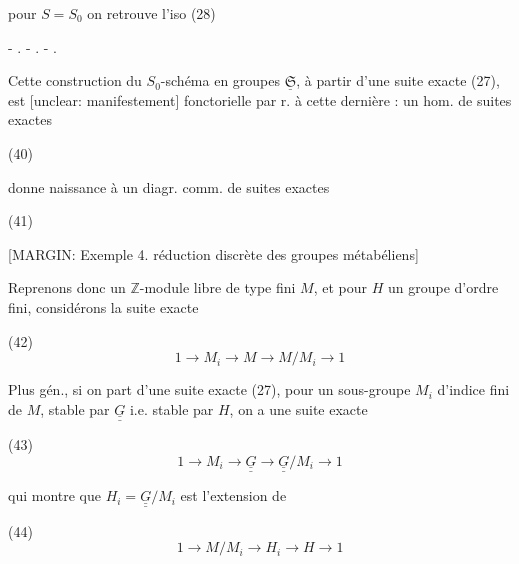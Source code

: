 pour $S=S_0$ on retrouve l'iso (28)

- . - . - .

Cette construction du $S_0$-schéma en
groupes $\underline{\mathfrak{S}}$, à partir d'une
suite exacte (27), est [unclear: manifestement]
fonctorielle par r. à cette dernière : un
hom. de suites exactes

(40)

donne naissance à un diagr. comm.
de suites exactes

\newpage


(41)

[MARGIN: Exemple 4. réduction discrète des groupes métabéliens]

Reprenons donc un $\mathbb{Z}$-module libre
de type fini $M$, et pour $H$ un
groupe d'ordre fini, considérons
la suite exacte

(42) $$1 \longrightarrow M_i \longrightarrow M \longrightarrow M/M_i \longrightarrow 1$$

Plus gén., si on part d'une suite
exacte (27), pour un sous-groupe $M_i$
d'indice fini de $M$, stable par
$\underline{\underline{G}}$ i.e. stable par $H$, on a une
suite exacte

(43) $$1 \longrightarrow M_i \longrightarrow \underline{\underline{G}} \longrightarrow \underline{\underline{G}}/M_i \longrightarrow 1$$

qui montre que $H_i = \underline{\underline{G}}/M_i$
est l'extension de

(44) $$1 \longrightarrow M/M_i \longrightarrow H_i \longrightarrow H \longrightarrow 1$$

